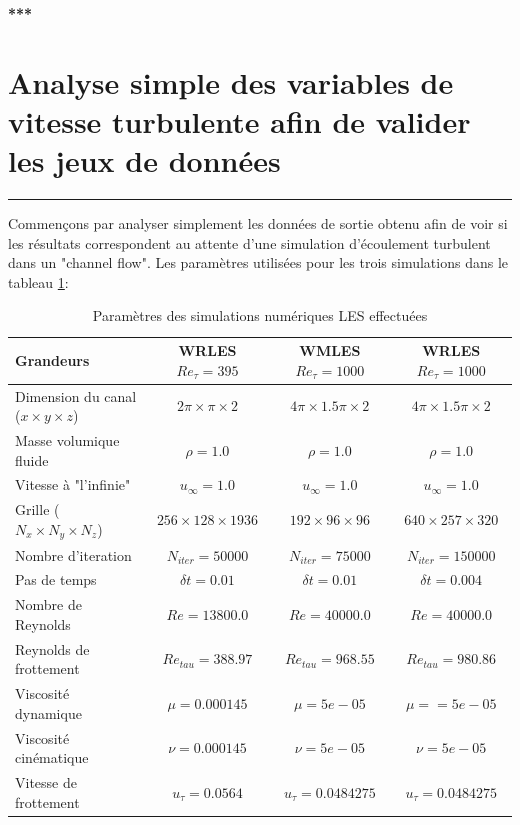\documentclass[12pt]{article}
\theoremstyle{plain}
\theoremstyle{remark}
\begin{document}
\begin{center}
	\large \bf{***}
\end{center}

\vspace{0.3cm}
\section{Analyse simple des variables de vitesse turbulente afin de valider les jeux de données}
\noindent\rule{\linewidth}{2pt}
\vspace{0.1cm}

Commençons par analyser simplement les données de sortie obtenu afin de voir si les résultats correspondent au attente d'une simulation d'écoulement turbulent dans un "channel flow". Les paramètres utilisées pour les trois simulations dans le tableau \ref{tab:parameters}: \\

\begin{table}[!h]
	\begin{tabular}{l | c | c | c}

		Grandeurs & WRLES $Re_{\tau}=395$ & WMLES $Re_{\tau}=1000$ & WRLES $Re_{\tau}=1000$\\ \hline \hline
		Dimension du canal ($x\times y \times z$) &  $2\pi\times\pi\times2$ & $4\pi\times1.5\pi\times2$ & $4\pi\times1.5\pi\times2$\\
		Masse volumique fluide &  $\rho = 1.0$ & $\rho = 1.0$ & $\rho = 1.0$ \\
		Vitesse à "l'infinie" & $u_{\infty}=1.0$ & $u_{\infty}=1.0$ & $u_{\infty}=1.0$  \\
		Grille ($N_x\times N_y \times N_z$) & $256\times128\times1936$ & $192\times96\times96$ & $640\times257\times320$ \\
		Nombre d'iteration & $N_{iter}=50000$ & $N_{iter}=75000$ & $N_{iter}=150000$ \\
		Pas de temps & $\delta t=0.01$ & $\delta t=0.01$ & $\delta t=0.004$ \\
		Nombre de Reynolds & $Re = 13800.0$ & $Re = 40000.0$ & $Re = 40000.0$ \\
		Reynolds de frottement & $Re_{tau} = 388.97$ & $Re_{tau} = 968.55$ & $Re_{tau} = 980.86$ \\
		Viscosité dynamique& $\mu = 0.000145$ & $\mu = 5e-05$ & $\mu = = 5e-05$ \\
		Viscosité cinématique & $\nu = 0.000145$ & $\nu = 5e-05$ & $\nu = 5e-05$ \\
		Vitesse de frottement & $u_{\tau} = 0.0564$ & $u_{\tau} = 0.0484275$ & $u_{\tau} = 0.0484275$ \\
		\hline
	\end{tabular}
	\caption{Paramètres des simulations numériques LES effectuées}
	\label{tab:parameters}
\end{table}
\end{document}
